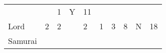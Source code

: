 \documentclass[12pt]{article}
\begin{document}
\begin{longtable}[]{@{}llllllllll@{}}
\begin{minipage}[t]{0.06\columnwidth}\raggedright\strut
\strut\end{minipage} &
\begin{minipage}[t]{0.06\columnwidth}\raggedright\strut
\strut\end{minipage} &
\begin{minipage}[t]{0.06\columnwidth}\raggedright\strut
1
\strut\end{minipage} &
\begin{minipage}[t]{0.07\columnwidth}\raggedright\strut
Y
\strut\end{minipage} &
\begin{minipage}[t]{0.08\columnwidth}\raggedright\strut
11
\strut\end{minipage}\tabularnewline
\begin{minipage}[t]{0.13\columnwidth}\raggedright\strut
Lord
\strut\end{minipage} &
\begin{minipage}[t]{0.06\columnwidth}\raggedright\strut
2
\strut\end{minipage} &
\begin{minipage}[t]{0.06\columnwidth}\raggedright\strut
2
\strut\end{minipage} &
\begin{minipage}[t]{0.06\columnwidth}\raggedright\strut
\strut\end{minipage} &
\begin{minipage}[t]{0.06\columnwidth}\raggedright\strut
2
\strut\end{minipage} &
\begin{minipage}[t]{0.06\columnwidth}\raggedright\strut
1
\strut\end{minipage} &
\begin{minipage}[t]{0.06\columnwidth}\raggedright\strut
3
\strut\end{minipage} &
\begin{minipage}[t]{0.06\columnwidth}\raggedright\strut
8
\strut\end{minipage} &
\begin{minipage}[t]{0.07\columnwidth}\raggedright\strut
N
\strut\end{minipage} &
\begin{minipage}[t]{0.08\columnwidth}\raggedright\strut
18
\strut\end{minipage}\tabularnewline
\begin{minipage}[t]{0.13\columnwidth}\raggedright\strut
Samurai
\strut\end{minipage} &

\end{longtable}
\end{document}
